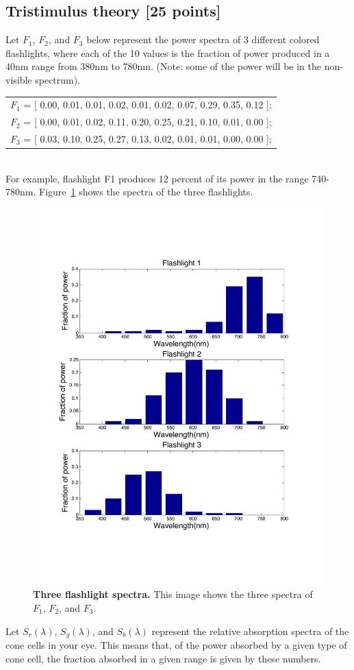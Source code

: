 \documentclass[10pt,letterpaper]{article}
\begin{document}
\subsection{Tristimulus theory [25 points]} Let $F_1$, $F_2$, and $F_3$ below
represent the power spectra of 3 different colored flashlights, where each of the 10 values is the fraction of power produced in a 40nm range from 380nm to 780nm. (Note: some of the power will be in the non-visible spectrum).\\

\begin{tabular}{c}
$F_1$ = [ 0.00, 0.01, 0.01, 0.02, 0.01, 0.02, 0.07, 0.29, 0.35, 0.12 ];\\
$F_2$ = [ 0.00, 0.01, 0.02, 0.11, 0.20, 0.25, 0.21, 0.10, 0.01, 0.00 ];\\
$F_3$ = [ 0.03, 0.10, 0.25, 0.27, 0.13, 0.02, 0.01, 0.01, 0.00, 0.00 ];\\
\end{tabular} \\

For example, flashlight F1 produces 12 percent of its power in the range 740-780nm. Figure~\ref{fig:spectra} shows the spectra of the three flashlights.\\

\begin{figure}[h]
\centering
\includegraphics[width=0.5\linewidth]{flashlight-spectrum.pdf}
\caption{\label{fig:spectra}\textbf{Three flashlight spectra.} This image shows the three spectra of $F_1$, $F_2$, and $F_3$.}
\end{figure}

Let $S_r(\lambda)$, $S_g(\lambda)$, and $S_b(\lambda)$ represent the relative absorption spectra of the cone cells in your eye. This means that, of the power absorbed by a given type of cone cell, the fraction absorbed in a given range is given by these numbers.\\
\end{document}
